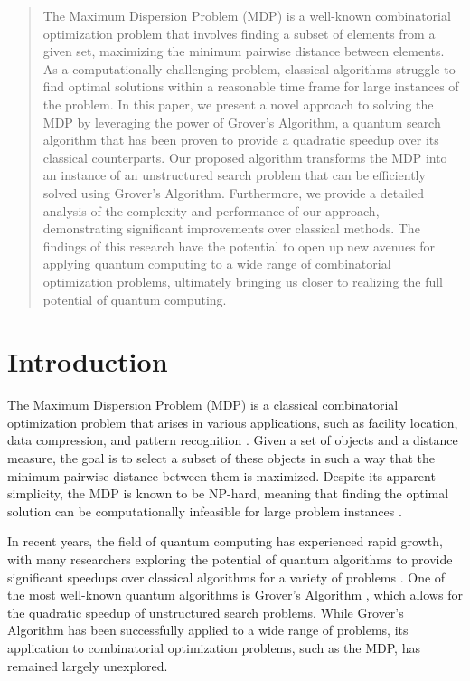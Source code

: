 \begin{abstract}
The Maximum Dispersion Problem (MDP) is a well-known combinatorial optimization problem that involves finding a subset of elements from a given set, maximizing the minimum pairwise distance between elements. As a computationally challenging problem, classical algorithms struggle to find optimal solutions within a reasonable time frame for large instances of the problem. In this paper, we present a novel approach to solving the MDP by leveraging the power of Grover's Algorithm, a quantum search algorithm that has been proven to provide a quadratic speedup over its classical counterparts. Our proposed algorithm transforms the MDP into an instance of an unstructured search problem that can be efficiently solved using Grover's Algorithm. Furthermore, we provide a detailed analysis of the complexity and performance of our approach, demonstrating significant improvements over classical methods. The findings of this research have the potential to open up new avenues for applying quantum computing to a wide range of combinatorial optimization problems, ultimately bringing us closer to realizing the full potential of quantum computing.
\end{abstract}

\section{Introduction}
\label{sec:introduction}
The Maximum Dispersion Problem (MDP) is a classical combinatorial optimization problem that arises in various applications, such as facility location, data compression, and pattern recognition \cite{mdp_applications}. Given a set of objects and a distance measure, the goal is to select a subset of these objects in such a way that the minimum pairwise distance between them is maximized. Despite its apparent simplicity, the MDP is known to be NP-hard, meaning that finding the optimal solution can be computationally infeasible for large problem instances \cite{mdp_np_hard}.

In recent years, the field of quantum computing has experienced rapid growth, with many researchers exploring the potential of quantum algorithms to provide significant speedups over classical algorithms for a variety of problems \cite{quantum_computing}. One of the most well-known quantum algorithms is Grover's Algorithm \cite{grover}, which allows for the quadratic speedup of unstructured search problems. While Grover's Algorithm has been successfully applied to a wide range of problems, its application to combinatorial optimization problems, such as the MDP, has remained largely unexplored.

